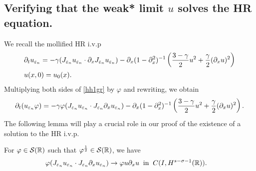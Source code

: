 \subsection{Verifying that the weak* limit $u$ solves the HR equation.} 
We recall the mollified HR i.v.p
\begin{align}
& \partial_t u_{\varepsilon_n}  = -\gamma(J_{\varepsilon_n} u_{\varepsilon_n} \cdot \partial_x
J_{\varepsilon_n} u_{\varepsilon_n}) - \partial_x(1- \partial_x^2)^{-1} \left( \frac{3-\gamma}{2} u^2
+ \frac{\gamma}{2} (\partial_x u)^2 \right ) 
\label{hh1gr}
\\
& u(x,0) = u_0(x).
\label{hh2gr}
\end{align}
Multiplying both sides of \eqref{hh1gr} by $\varphi$ and rewriting,
we obtain
\begin{equation}
\label{hh3}
\begin{split}
\partial_t(u_{\varepsilon_n} \varphi) = -\gamma \varphi (J_{\varepsilon_n} u_{\varepsilon_n} \cdot
J_{\varepsilon_n} \partial_x u_{\varepsilon_n}) - \partial_x(1- \partial_x^2)^{-1} \left( \frac{3-\gamma}{2} u^2
+ \frac{\gamma}{2} (\partial_x u)^2 \right ).
\end{split}
\end{equation}
The following lemma will play a crucial role in our proof of the
existence of a solution to the HR i.v.p.
\begin{lemma}
\label{hhlem:cc}
For $\varphi \in \mathcal{S}(\mathbb{R})$ such that
$\varphi^\frac{1}{2} \in \mathcal{S}(\mathbb{R})$, we have
\begin{equation}
\begin{split}
\label{hhburgers_and_nonlocal_conv}
& \varphi (J_{\varepsilon_n} u_{\varepsilon_n} 
\cdot J_{\varepsilon_n}\partial_x u_{\varepsilon_n}) 
\to \varphi u \partial_x u \; \; 
\text{in} \; \;
C(I, H^{s-\sigma-1}(\mathbb{R})). 
\end{split}
\end{equation}
\end{lemma}
%
